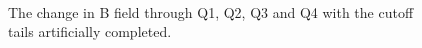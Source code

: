 \documentclass[letter,11pt]{article}
\begin{document}
\begin{figure}
\centering
	\\
	\caption{The change in B field through Q1, Q2, Q3 and Q4 with the cutoff tails artificially completed.}
	\label{fig:quads2}
\end{figure}
\end{document}
